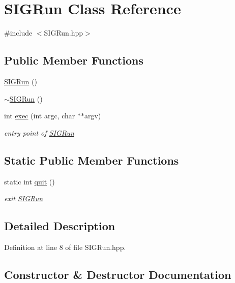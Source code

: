 \hypertarget{class_s_i_g_run}{}\section{S\+I\+G\+Run Class Reference}
\label{class_s_i_g_run}


{\ttfamily \#include $<$S\+I\+G\+Run.\+hpp$>$}

\subsection*{Public Member Functions}
\begin{DoxyCompactItemize}
\item 
\mbox{\hyperlink{class_s_i_g_run_a42faa5a4dd64664d6bdce6c94f5adc1d}{S\+I\+G\+Run}} ()
\item 
\mbox{\hyperlink{class_s_i_g_run_addf9aae6daca50376eeed2b1c73e5a07}{$\sim$\+S\+I\+G\+Run}} ()
\item 
int \mbox{\hyperlink{class_s_i_g_run_a26887ac64836e80c0b7eaaaeff0f6d14}{exec}} (int argc, char $\ast$$\ast$argv)
\begin{DoxyCompactList}\small\item\em entry point of \mbox{\hyperlink{class_s_i_g_run}{S\+I\+G\+Run}} \end{DoxyCompactList}\end{DoxyCompactItemize}
\subsection*{Static Public Member Functions}
\begin{DoxyCompactItemize}
\item 
static int \mbox{\hyperlink{class_s_i_g_run_ab650777985ff7f5784bf59f1cdf370f5}{quit}} ()
\begin{DoxyCompactList}\small\item\em exit \mbox{\hyperlink{class_s_i_g_run}{S\+I\+G\+Run}} \end{DoxyCompactList}\end{DoxyCompactItemize}


\subsection{Detailed Description}


Definition at line 8 of file S\+I\+G\+Run.\+hpp.



\subsection{Constructor \& Destructor Documentation}
\mbox{\label{class_s_i_g_run_a42faa5a4dd64664d6bdce6c94f5adc1d}} 
